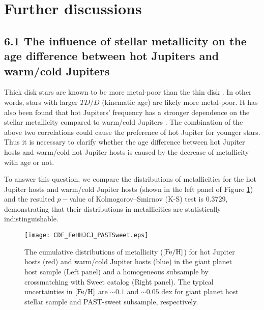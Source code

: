 \documentclass[twocolumn]{pnas-new}
\begin{document}
\section{Further discussions}
\label{sec.dis}


\subsection*{6.1 The influence of stellar metallicity on the age difference between hot Jupiters and warm/cold Jupiters}
\label{sec.dis.FeH}

Thick disk stars are known to be more metal-poor than the thin disk \citep{1989ARA&A..27..555G,2003A&A...410..527B,2014A&A...562A..71B,2018MNRAS.478.4513B}. 
In other words, stars with larger $TD/D$ (kinematic age) are likely more metal-poor.
It has also been found that hot Jupiters' frequency has a stronger dependence on the stellar metallicity compared to warm/cold Jupiters \citep{2010PASP..122..905J,2015AJ....149...14W,2016A&A...587A..64S}.
The combination of the above two correlations could cause the preference of hot Jupiter for younger stars.
Thus it is necessary to clarify whether the age difference between hot Jupiter hosts and warm/cold hot Jupiter hosts is caused by the decrease of metallicity with age or not.




To answer this question, we  compare the distributions of metallicities for the hot Jupiter hosts and warm/cold Jupiter hosts (shown in the left panel of Figure \ref{figFeH_HJvsCJPAST}) and the resulted $p-$value of Kolmogorov–Smirnov (K-S) test is 0.3729, demonstrating that their distributions in metallicities are statistically indistinguishable.

\begin{figure}[!t]
\centering
\texttt{[image: CDF\_FeHHJCJ\_PASTSweet.eps]}
\caption{The cumulative distributions of metallicity ($\rm [Fe/H]$) for hot Jupiter hosts (red) and warm/cold Jupiter hosts (blue) in the giant planet host sample (Left panel) and a homogeneous subsample by crossmatching with Sweet catalog (Right panel).
{The typical uncertainties in $\rm [Fe/H]$ are $\sim 0.1$ and $\sim 0.05$ dex for giant planet host stellar sample and PAST-sweet subsample, respectively.}
\label{figFeH_HJvsCJPAST}}
\end{figure}
\end{document}
